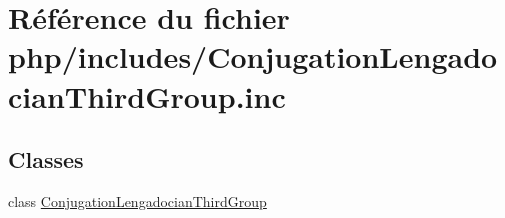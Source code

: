 \hypertarget{_conjugation_lengadocian_third_group_8inc}{}\section{Référence du fichier php/includes/\+Conjugation\+Lengadocian\+Third\+Group.inc}
\label{_conjugation_lengadocian_third_group_8inc}
\subsection*{Classes}
\begin{DoxyCompactItemize}
\item 
class \hyperlink{class_conjugation_lengadocian_third_group}{Conjugation\+Lengadocian\+Third\+Group}
\end{DoxyCompactItemize}

